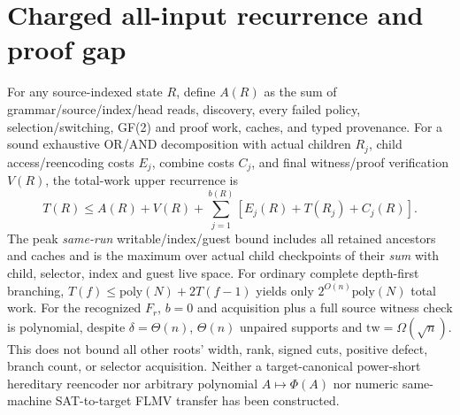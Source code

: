 \documentclass[11pt]{article}
\begin{document}
\section*{Charged all-input recurrence and proof gap}
For any source-indexed state $R$, define $A(R)$ as the sum of grammar/source/index/head reads, discovery, every failed policy, selection/switching, GF(2) and proof work, caches, and typed provenance. For a sound exhaustive OR/AND decomposition with actual children $R_j$, child access/reencoding costs $E_j$, combine costs $C_j$, and final witness/proof verification $V(R)$, the total-work upper recurrence is
\[
T(R)\le A(R)+V(R)+\sum_{j=1}^{b(R)}[E_j(R)+T(R_j)+C_j(R)].
\]
The peak \emph{same-run} writable/index/guest bound includes all retained ancestors and caches and is the maximum over actual child checkpoints of their \emph{sum} with child, selector, index and guest live space. For ordinary complete depth-first branching, $T(f)\le\mathrm{poly}(N)+2T(f-1)$ yields only $2^{O(n)}\mathrm{poly}(N)$ total work. For the recognized $F_r$, $b=0$ and acquisition plus a full source witness check is polynomial, despite $\delta=\Theta(n)$, $\Theta(n)$ unpaired supports and $\mathrm{tw}=\Omega(\sqrt n)$. This does not bound all other roots' width, rank, signed cuts, positive defect, branch count, or selector acquisition. Neither a target-canonical power-short hereditary reencoder nor arbitrary polynomial $A\mapsto\Phi(A)$ nor numeric same-machine SAT-to-target FLMV transfer has been constructed.
\end{document}
